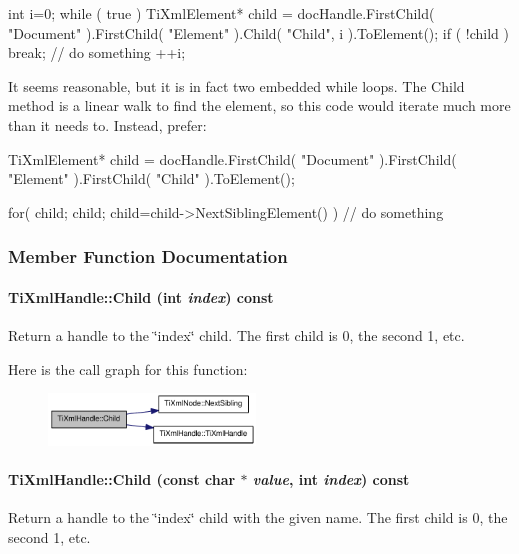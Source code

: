 \begin{DoxyVerb}
	int i=0;
	while ( true )
	{
		TiXmlElement* child = docHandle.FirstChild( "Document" ).FirstChild( "Element" ).Child( "Child", i ).ToElement();
		if ( !child )
			break;
		// do something
		++i;
	}
	\end{DoxyVerb}


It seems reasonable, but it is in fact two embedded while loops. The Child method is a linear walk to find the element, so this code would iterate much more than it needs to. Instead, prefer:

\begin{DoxyVerb}
	TiXmlElement* child = docHandle.FirstChild( "Document" ).FirstChild( "Element" ).FirstChild( "Child" ).ToElement();

	for( child; child; child=child->NextSiblingElement() )
	{
		// do something
	}
	\end{DoxyVerb}
 

\subsubsection{Member Function Documentation}
\hypertarget{class_ti_xml_handle_af9cf6a7d08a5da94a8924425ad0cd5ac}{
\paragraph[{Child}]{ TiXmlHandle::Child (int {\em index}) const}\hfill}
\label{class_ti_xml_handle_af9cf6a7d08a5da94a8924425ad0cd5ac}
Return a handle to the \char`\"{}index\char`\"{} child. The first child is 0, the second 1, etc. 

Here is the call graph for this function:\nopagebreak
\begin{figure}[H]
\begin{center}
\leavevmode
\includegraphics[width=156pt]{class_ti_xml_handle_af9cf6a7d08a5da94a8924425ad0cd5ac_cgraph}
\end{center}
\end{figure}
\hypertarget{class_ti_xml_handle_a072492b4be1acdb0db2d03cd8f71ccc4}{
\paragraph[{Child}]{ TiXmlHandle::Child (const char $\ast$ {\em value}, \/  int {\em index}) const}\hfill}
\label{class_ti_xml_handle_a072492b4be1acdb0db2d03cd8f71ccc4}
Return a handle to the \char`\"{}index\char`\"{} child with the given name. The first child is 0, the second 1, etc. 


